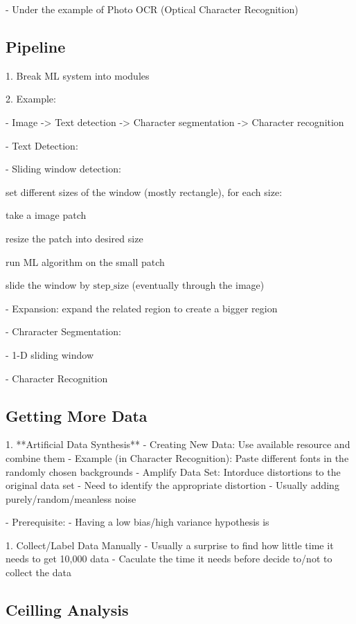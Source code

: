 - Under the example of Photo OCR (Optical Character Recognition)

\subsection{Pipeline}

1. Break ML system into modules

2. Example:

- Image -> Text detection -> Character segmentation -> Character recognition

- Text Detection: 

- Sliding window detection: 

	set different sizes of the window (mostly rectangle), for each size:

		take a image patch

		resize the patch into desired size

		run ML algorithm on the small patch

		slide the window by $\text{step\_size}$  (eventually through the image)

- Expansion: expand the related region to create a bigger region

- Chraracter Segmentation:

- 1-D sliding window

- Character Recognition

\subsection{Getting More Data}

1. **Artificial Data Synthesis** 
- Creating New Data: Use available resource and combine them
- Example (in Character Recognition): Paste different fonts in the randomly chosen backgrounds
- Amplify Data Set: Intorduce distortions to the original data set
- Need to identify the appropriate distortion
- Usually adding purely/random/meanless noise

- Prerequisite:
- Having a low bias/high variance hypothesis is 

1. Collect/Label Data Manually
- Usually a surprise to find how little time it needs to get 10,000 data
- Caculate the time it needs before decide to/not to collect the data

\subsection{Ceilling Analysis}


